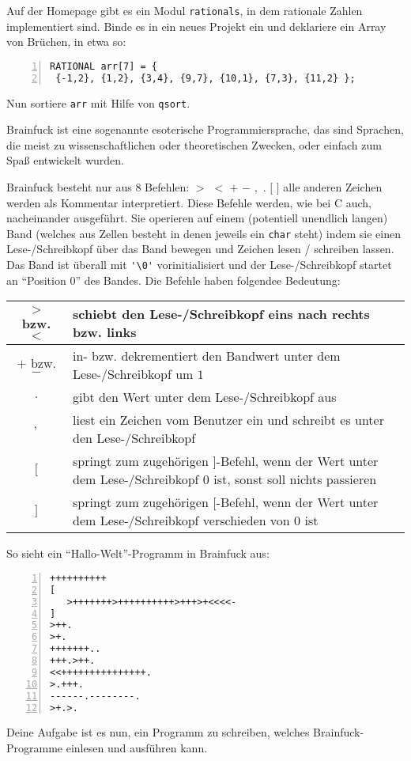 \documentclass{uebungszettel}
\begin{document}
\begin{aufg} Auf der Homepage gibt es ein Modul \verb|rationals|, in dem rationale Zahlen implementiert sind. Binde es in ein neues Projekt ein und deklariere ein Array von Brüchen, in etwa so:
\begin{codelisting}
\begin{lstlisting}[numbers=left,numberstyle=\tiny,frame=tlrb]
RATIONAL arr[7] = { 
 {-1,2}, {1,2}, {3,4}, {9,7}, {10,1}, {7,3}, {11,2} };
\end{lstlisting}
\end{codelisting}
Nun sortiere \verb|arr| mit Hilfe von \verb|qsort|.
\end{aufg}

\begin{aufg}
Brainfuck ist eine sogenannte esoterische Programmiersprache, das sind Sprachen, die meist zu wissenschaftlichen oder theoretischen Zwecken, oder einfach zum Spaß entwickelt wurden. 

Brainfuck besteht nur aus $8$ Befehlen: $>$ $<$ $+$ $-$ $,$ $.$ $[$ $]$ alle anderen Zeichen werden als Kommentar interpretiert. Diese Befehle werden, wie bei C auch, nacheinander ausgeführt. Sie operieren auf einem (potentiell unendlich langen) Band (welches aus Zellen besteht in denen jeweils ein \verb|char| steht) indem sie einen Lese-/Schreibkopf über das Band bewegen und Zeichen lesen / schreiben lassen. Das Band ist überall mit \verb|'\0'| vorinitialisiert und der Lese-/Schreibkopf startet an ``Position $0$'' des Bandes. Die Befehle haben folgendee Bedeutung:

\begin{tabular}{|c|p{10cm}|} \hline
$>$ bzw. $<$ & schiebt den Lese-/Schreibkopf eins nach rechts bzw. links \\\hline
$+$ bzw. $-$ & in- bzw. dekrementiert den Bandwert unter dem Lese-/Schreibkopf um $1$ \\\hline
$.$ & gibt den Wert unter dem Lese-/Schreibkopf aus \\\hline
$,$ & liest ein Zeichen vom Benutzer ein und schreibt es unter den Lese-/Schreibkopf \\\hline
$[$ & springt zum zugehörigen $]$-Befehl, wenn der Wert unter dem Lese-/Schreibkopf $0$ ist, sonst soll nichts passieren\\\hline
$]$ & springt zum zugehörigen $[$-Befehl, wenn der Wert unter dem Lese-/Schreibkopf verschieden von $0$ ist\\\hline
\end{tabular}

\newpage
So sieht ein ``Hallo-Welt''-Programm in Brainfuck aus:

\begin{codelisting}
\begin{lstlisting}[numbers=left,numberstyle=\tiny,frame=tlrb,mathescape=true]
++++++++++
[
   >+++++++>++++++++++>+++>+<<<<-
]
>++.
>+.
+++++++..
+++.>++.
<<+++++++++++++++.
>.+++.
------.--------.
>+.>.
\end{lstlisting}
\end{codelisting}
Deine Aufgabe ist es nun, ein Programm zu schreiben, welches Brainfuck-Programme einlesen und ausführen kann. 
\end{aufg}
\end{document}
